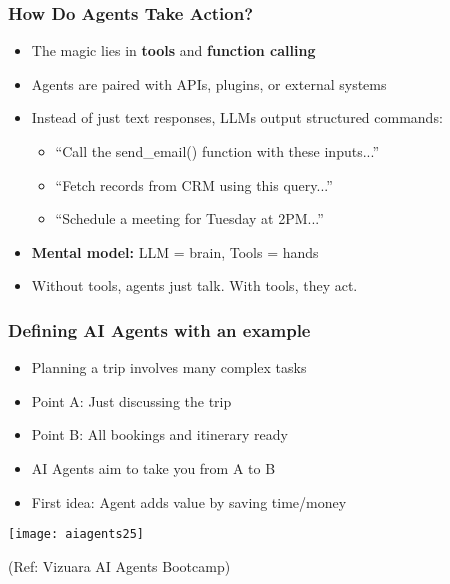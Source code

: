 \begin{frame}[fragile]\frametitle{How Do Agents Take Action?}
\begin{itemize}
    \item The magic lies in \textbf{tools} and \textbf{function calling}
    \item Agents are paired with APIs, plugins, or external systems
    \item Instead of just text responses, LLMs output structured commands:
    \begin{itemize}
        \item ``Call the send\_email() function with these inputs...''
        \item ``Fetch records from CRM using this query...''
        \item ``Schedule a meeting for Tuesday at 2PM...''
    \end{itemize}
    \item \textbf{Mental model:} LLM = brain, Tools = hands
    \item Without tools, agents just talk. With tools, they act.
\end{itemize}
\end{frame}


\begin{frame}[fragile]\frametitle{Defining AI Agents with an example}

      \begin{itemize}
		\item Planning a trip involves many complex tasks
		\item Point A: Just discussing the trip
		\item Point B: All bookings and itinerary ready
		\item AI Agents aim to take you from A to B
		\item First idea: Agent adds value by saving time/money
      \end{itemize}

		\begin{center}
		\texttt{[image: aiagents25]}
		
		{\tiny (Ref: Vizuara AI Agents Bootcamp)}
		\end{center}	

\end{frame}

